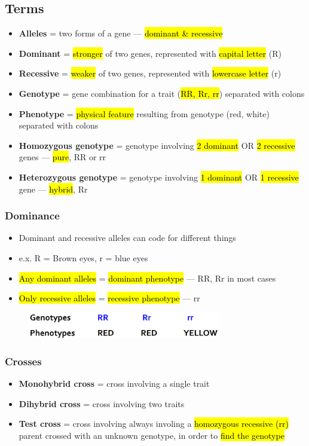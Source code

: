 \documentclass[a4paper,12pt]{article}
\begin{document}
\subsection{Terms}
\begin{itemize}
    \item{\textbf{Alleles} = two forms of a gene --- \hl{dominant \& recessive}}
    \item{\textbf{Dominant} = \hl{stronger} of two genes, represented with \hl{capital letter} (R)}
    \item{\textbf{Recessive} = \hl{weaker} of two genes, represented with \hl{lowercase letter} (r)}
    \item{\textbf{Genotype} = gene combination for a trait (\hl{RR, Rr, rr}) separated with colons}
    \item{\textbf{Phenotype} = \hl{physical feature} resulting from genotype (red, white) separated with colons}
    \item{\textbf{Homozygous genotype} = genotype involving \hl{2 dominant} OR \hl{2 recessive} genes --- \hl{pure}, RR or rr}
    \item{\textbf{Heterozygous genotype} = genotype involving \hl{1 dominant} OR \hl{1 recessive} gene --- \hl{hybrid}, Rr}
\end{itemize}

\pagebreak

\subsubsection{Dominance}
\begin{itemize}
    \item{Dominant and recessive alleles can code for different things}
    \item{e.x. R = Brown eyes, r = blue eyes}
    \item{\hl{Any dominant alleles} = \hl{dominant phenotype} --- RR, Rr in most cases}
    \item{\hl{Only recessive alleles} = \hl{recessive phenotype} --- rr}
\end{itemize}

\begin{figure}[H]
    \centering
    \includegraphics[width=0.75\textwidth]{dom}
\end{figure}

\subsubsection{Crosses}
\begin{itemize}
    \item{\textbf{Monohybrid cross} = cross involving a single trait}
    \item{\textbf{Dihybrid cross} = cross involving two traits}
    \item{\textbf{Test cross} = cross involving always involing a \hl{homozygous recessive (rr)} parent crossed with an unknown genotype, in order to \hl{find the genotype}}
\end{itemize}
\end{document}
